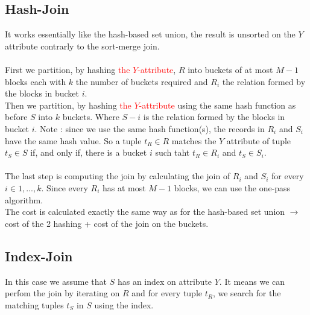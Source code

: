 \documentclass[12pt,a4paper]{article}
\begin{document}
\subsection{Hash-Join}
It works essentially like the hash-based set union, the result is unsorted on the $Y$ attribute contrarly to the sort-merge join.\\
\\
First we partition, by hashing \textcolor{red}{the $Y$-attribute}, $R$ into buckets of at most $M - 1$ blocks each with $k$ the number of buckets required and $R_i$ the relation formed by the blocks in bucket $i$.\\
Then we partition, by hashing \textcolor{red}{the $Y$-attribute} using the same hash function as before $S$ into $k$ buckets. Where $S-i$ is the relation formed by the blocks in bucket $i$. Note : since we use the same hash function(s), the records in $R_i$ and $S_i$ have the same hash value. So a tuple $t_R \in R$ matches the $Y$ attribute of tuple $t_S \in S$ if, and only if, there is a bucket $i$ such taht $t_R \in R_i$ and $t_S \in S_i$.\\
\\
The last step is computing the join by calculating the join of $R_i$ and $S_i$ for every $i \in 1,...,k$. Since every $R_i$ has at most $M-1$ blocks, we can use the one-pass algorithm.\\

The cost is calculated exactly the same way as for the hash-based set union $\longrightarrow$  cost of the 2 hashing + cost of the join on the buckets.


\subsection{Index-Join}
In this case we assume that $S$ has an index on attribute $Y$. It means we can perfom the join by iterating on $R$ and for every tuple $t_R$, we search for the matching tuples $t_S$ in $S$ using the index. \\
\end{document}
